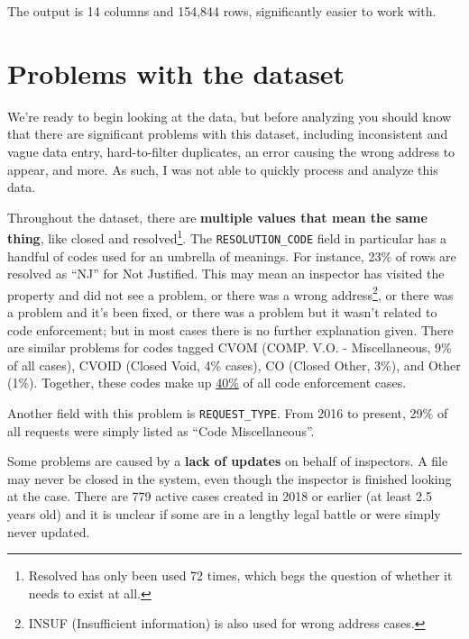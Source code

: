 \documentclass[
]{book}
\begin{document}
The output is 14 columns and 154,844 rows, significantly easier to work with.

\hypertarget{problems-with-the-dataset}{%
\section{Problems with the dataset}\label{problems-with-the-dataset}}

We're ready to begin looking at the data, but before analyzing you should know that there are significant problems with this dataset, including inconsistent and vague data entry, hard-to-filter duplicates, an error causing the wrong address to appear, and more. As such, I was not able to quickly process and analyze this data.

Throughout the dataset, there are \textbf{multiple values that mean the same thing}, like closed and resolved\footnote{Resolved has only been used 72 times, which begs the question of whether it needs to exist at all.}. The \texttt{RESOLUTION\_CODE} field in particular has a handful of codes used for an umbrella of meanings. For instance, 23\% of rows are resolved as ``NJ'' for Not Justified. This may mean an inspector has visited the property and did not see a problem, or there was a wrong address\footnote{INSUF (Insufficient information) is also used for wrong address cases.}, or there was a problem and it's been fixed, or there was a problem but it wasn't related to code enforcement; but in most cases there is no further explanation given. There are similar problems for codes tagged CVOM (COMP. V.O. - Miscellaneous, 9\% of all cases), CVOID (Closed Void, 4\% cases), CO (Closed Other, 3\%), and Other (1\%). Together, these codes make up \underline{40\%} of all code enforcement cases.

Another field with this problem is \texttt{REQUEST\_TYPE}. From 2016 to present, 29\% of all requests were simply listed as ``Code Miscellaneous''.

Some problems are caused by a \textbf{lack of updates} on behalf of inspectors. A file may never be closed in the system, even though the inspector is finished looking at the case. There are 779 active cases created in 2018 or earlier (at least 2.5 years old) and it is unclear if some are in a lengthy legal battle or were simply never updated.
\end{document}

